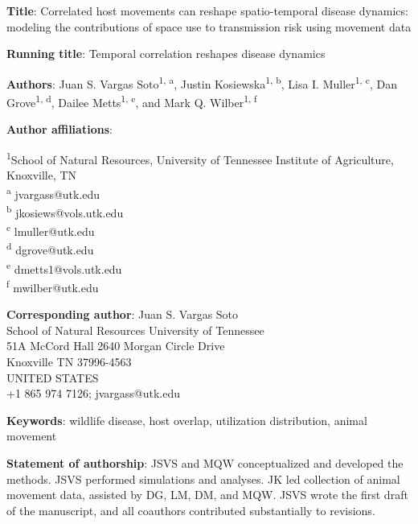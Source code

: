 \documentclass[letterpaper]{article}
\begin{document}
\noindent
\textbf{Title}: Correlated host movements can reshape spatio-temporal disease dynamics: modeling the contributions of space use to transmission risk using movement data

\bigskip

\noindent
\textbf{Running title}: Temporal correlation reshapes disease dynamics

\bigskip

\noindent
\textbf{Authors}: Juan S. Vargas Soto\textsuperscript{1, a}, Justin Kosiewska\textsuperscript{1, b}, Lisa I. Muller\textsuperscript{1, c}, Dan Grove\textsuperscript{1, d}, Dailee Metts\textsuperscript{1, e}, and Mark Q. Wilber\textsuperscript{1, f}

\bigskip

\noindent
\textbf{Author affiliations}:

\noindent
\textsuperscript{1}School of Natural Resources, University of Tennessee Institute of Agriculture, Knoxville, TN \\
\textsuperscript{a} jvargass@utk.edu\\
\textsuperscript{b} jkosiews@vols.utk.edu\\
\textsuperscript{c} lmuller@utk.edu\\
\textsuperscript{d} dgrove@utk.edu\\
\textsuperscript{e} dmetts1@vols.utk.edu\\
\textsuperscript{f} mwilber@utk.edu

\bigskip

\noindent
\textbf{Corresponding author}: Juan S. Vargas Soto\\
School of Natural Resources University of Tennessee\\
51A McCord Hall 2640 Morgan Circle Drive\\
Knoxville TN 37996-4563\\
UNITED STATES\\
+1 865 974 7126; jvargass@utk.edu

\bigskip

\noindent
\textbf{Keywords}: wildlife disease, host overlap, utilization distribution, animal movement

\bigskip

\noindent

\bigskip
\noindent
\textbf{Statement of authorship}: JSVS and MQW conceptualized and developed the methods. JSVS performed simulations and analyses. JK led collection of animal movement data, assisted by DG, LM, DM, and MQW. JSVS wrote the first draft of the manuscript, and all coauthors contributed substantially to revisions. 
\end{document}
